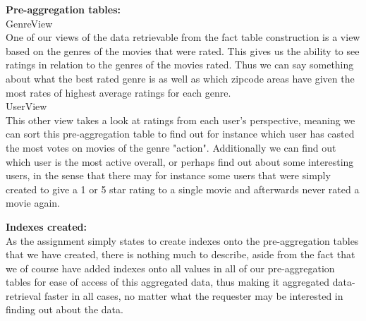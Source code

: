 \textbf{Pre-aggregation tables:} \\
GenreView \\
One of our views of the data retrievable from the fact table construction is a view based on the genres of the movies that were rated. This gives us the ability to see ratings in relation to the genres of the movies rated. Thus we can say something about what the best rated genre is as well as which zipcode areas have given the most rates of highest average ratings for each genre. \\

UserView \\
This other view takes a look at ratings from each user's perspective, meaning we can sort this pre-aggregation table to find out for instance which user has casted the most votes on movies of the genre "action". Additionally we can find out which user is the most active overall, or perhaps find out about some interesting users, in the sense that there may for instance some users that were simply created to give a 1 or 5 star rating to a single movie and afterwards never rated a movie again.

\textbf{Indexes created:} \\
As the assignment simply states to create indexes onto the pre-aggregation tables that we have created, there is nothing much to describe, aside from the fact that we of course have added indexes onto all values in all of our pre-aggregation tables for ease of access of this aggregated data, thus making it aggregated data-retrieval faster in all cases, no matter what the requester may be interested in finding out about the data.
